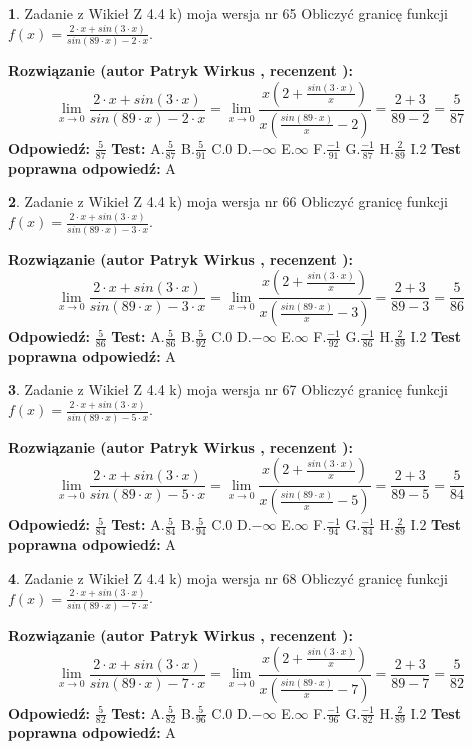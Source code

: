 \documentclass[12pt, a4paper]{article}
\theoremstyle{definition} %
\newtheorem{zad}{}
\newcommand{\zadStart}[1]{\begin{zad}#1\newline}
\newcommand{\zadStop}{\end{zad}}
\newcommand{\rozwStart}[2]{\noindent \textbf{Rozwiązanie (autor #1 , recenzent #2): }\newline}
\newcommand{\rozwStop}{\newline}
\newcommand{\odpStart}{\noindent \textbf{Odpowiedź:}\newline}
\newcommand{\odpStop}{\newline}
\newcommand{\testStart}{\noindent \textbf{Test:}\newline}
\newcommand{\testStop}{\newline}
\newcommand{\kluczStart}{\noindent \textbf{Test poprawna odpowiedź:}\newline}
\newcommand{\kluczStop}{\newline}
\begin{document}
\zadStart{Zadanie z Wikieł Z 4.4 k) moja wersja nr 65}
Obliczyć granicę funkcji $f(x)=\frac{2\cdot x +sin(3\cdot x)}{sin(89\cdot x) -2\cdot x}$.
\zadStop
\rozwStart{Patryk Wirkus}{}
$$\lim\limits_{x\to 0}\frac{2\cdot x +sin(3\cdot x)}{sin(89\cdot x) -2\cdot x}
=\lim\limits_{x\to 0}\frac{x(2+\frac{sin(3\cdot x)}{x})}{x(\frac{sin(89\cdot x)}{x}-2)}
=\frac{2+3}{89-2} = \frac{5}{87}$$
\rozwStop
\odpStart
$\frac{5}{87}$
\odpStop
\testStart
A.$\frac{5}{87}$
B.$\frac{5}{91}$
C.$0$
D.$-\infty$
E.$\infty$
F.$\frac{-1}{91}$
G.$\frac{-1}{87}$
H.$\frac{2}{89}$
I.$2$
\testStop
\kluczStart
A
\kluczStop



\zadStart{Zadanie z Wikieł Z 4.4 k) moja wersja nr 66}
Obliczyć granicę funkcji $f(x)=\frac{2\cdot x +sin(3\cdot x)}{sin(89\cdot x) -3\cdot x}$.
\zadStop
\rozwStart{Patryk Wirkus}{}
$$\lim\limits_{x\to 0}\frac{2\cdot x +sin(3\cdot x)}{sin(89\cdot x) -3\cdot x}
=\lim\limits_{x\to 0}\frac{x(2+\frac{sin(3\cdot x)}{x})}{x(\frac{sin(89\cdot x)}{x}-3)}
=\frac{2+3}{89-3} = \frac{5}{86}$$
\rozwStop
\odpStart
$\frac{5}{86}$
\odpStop
\testStart
A.$\frac{5}{86}$
B.$\frac{5}{92}$
C.$0$
D.$-\infty$
E.$\infty$
F.$\frac{-1}{92}$
G.$\frac{-1}{86}$
H.$\frac{2}{89}$
I.$2$
\testStop
\kluczStart
A
\kluczStop



\zadStart{Zadanie z Wikieł Z 4.4 k) moja wersja nr 67}
Obliczyć granicę funkcji $f(x)=\frac{2\cdot x +sin(3\cdot x)}{sin(89\cdot x) -5\cdot x}$.
\zadStop
\rozwStart{Patryk Wirkus}{}
$$\lim\limits_{x\to 0}\frac{2\cdot x +sin(3\cdot x)}{sin(89\cdot x) -5\cdot x}
=\lim\limits_{x\to 0}\frac{x(2+\frac{sin(3\cdot x)}{x})}{x(\frac{sin(89\cdot x)}{x}-5)}
=\frac{2+3}{89-5} = \frac{5}{84}$$
\rozwStop
\odpStart
$\frac{5}{84}$
\odpStop
\testStart
A.$\frac{5}{84}$
B.$\frac{5}{94}$
C.$0$
D.$-\infty$
E.$\infty$
F.$\frac{-1}{94}$
G.$\frac{-1}{84}$
H.$\frac{2}{89}$
I.$2$
\testStop
\kluczStart
A
\kluczStop



\zadStart{Zadanie z Wikieł Z 4.4 k) moja wersja nr 68}
Obliczyć granicę funkcji $f(x)=\frac{2\cdot x +sin(3\cdot x)}{sin(89\cdot x) -7\cdot x}$.
\zadStop
\rozwStart{Patryk Wirkus}{}
$$\lim\limits_{x\to 0}\frac{2\cdot x +sin(3\cdot x)}{sin(89\cdot x) -7\cdot x}
=\lim\limits_{x\to 0}\frac{x(2+\frac{sin(3\cdot x)}{x})}{x(\frac{sin(89\cdot x)}{x}-7)}
=\frac{2+3}{89-7} = \frac{5}{82}$$
\rozwStop
\odpStart
$\frac{5}{82}$
\odpStop
\testStart
A.$\frac{5}{82}$
B.$\frac{5}{96}$
C.$0$
D.$-\infty$
E.$\infty$
F.$\frac{-1}{96}$
G.$\frac{-1}{82}$
H.$\frac{2}{89}$
I.$2$
\testStop
\kluczStart
A
\kluczStop
\end{document}
